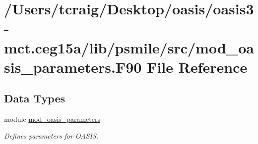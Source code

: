 \hypertarget{mod__oasis__parameters_8_f90}{\section{/\+Users/tcraig/\+Desktop/oasis/oasis3-\/mct.ceg15a/lib/psmile/src/mod\+\_\+oasis\+\_\+parameters.F90 File Reference}
\label{mod__oasis__parameters_8_f90}
}
\subsection*{Data Types}
\begin{DoxyCompactItemize}
\item 
module \hyperlink{classmod__oasis__parameters}{mod\+\_\+oasis\+\_\+parameters}
\begin{DoxyCompactList}\small\item\em Defines parameters for O\+A\+S\+I\+S. \end{DoxyCompactList}\end{DoxyCompactItemize}
